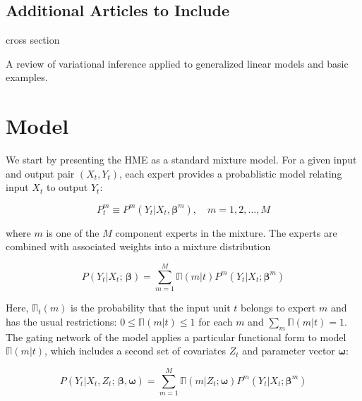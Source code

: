 \documentclass[12pt]{article}
\newcommand{\expmixwt}[0]{\mathbb{\Pi}}
\begin{document}
\subsection{Additional Articles to Include}

\cite{JeffriesPfeiffer2001} cross section

\cite{BleiKucukelbirMcAuliffe2006} A review of variational inference applied
to generalized linear models and basic examples.

\cite{CarvalhoSkoulakis2005}

\bigskip


\section{Model} \label{sec:Model}

We start by presenting the HME as a standard mixture model.
For a given input and output pair $(X_{t}, Y_{t})$, each expert
provides a probablistic model relating input $X_{t}$ to output
$Y_{t}$:

\begin{equation} \label{eq:ConditionalDistribution}
  P^{m}_{t} \equiv P^{m}(Y_{t}|X_{t}, \boldsymbol{\beta}^{m}), \quad m = 1,2,...,M
\end{equation}

where $m$ is one of the $M$ component experts in the mixture. The experts
are combined with associated weights into a mixture distribution

\begin{equation} \label{eq:staticmixture}
  P(Y_{t} | X_{t}; \, \boldsymbol{\beta}) = \sum_{m=1}^{M} \expmixwt(m|t) P^{m}(Y_{t} | X_{t}; \boldsymbol{\beta}^{m})
\end{equation}

Here, $\expmixwt_{t}(m)$ is the probability that the input unit $t$ belongs
to expert $m$ and has the usual restrictions: $0 \leq \expmixwt(m|t) \leq 1$
for each $m$ and $\sum_{m} \expmixwt(m|t) = 1$. The gating network of the model
applies a particular functional form to model $\expmixwt(m|t)$, which includes a
second set of covariates $Z_{t}$ and parameter vector $\boldsymbol{\omega}$:

\begin{equation} \label{eq:mixture}
  P(Y_{t} | X_{t}, Z_{t}; \, \boldsymbol{\beta}, \boldsymbol{\omega}) = \sum_{m=1}^{M} \expmixwt(m | Z_{t}; \boldsymbol{\omega}) P^{m}(Y_{t} | X_{t}; \boldsymbol{\beta}^{m})
\end{equation}
\end{document}
